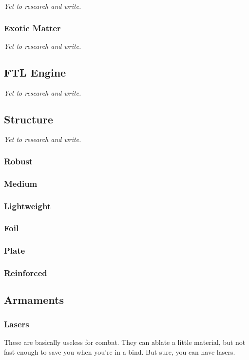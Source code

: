 \textit{Yet to research and write.}

\subsubsection{Exotic Matter}

\textit{Yet to research and write.}

\subsection{FTL Engine}

\textit{Yet to research and write.}

\subsection{Structure}

\textit{Yet to research and write.}

\subsubsection{Robust}

\subsubsection{Medium}

\subsubsection{Lightweight}

\subsubsection{Foil}

\subsubsection{Plate}

\subsubsection{Reinforced}

\subsection{Armaments}

\subsubsection{Lasers}
\par
These are basically useless for combat. They can ablate a little material, but not fast enough to save you when you're in a bind. But sure, you can have lasers.

